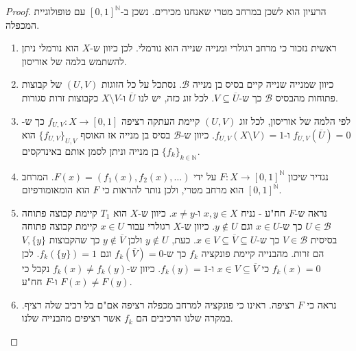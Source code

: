 \documentclass{tstextbook}
\begin{document}
\begin{proof}
הרעיון הוא לשכן במרחב מטרי שאנחנו מכירים. נשכן ב-\([0,1]^{\mathbb{N}}\) עם טופולוגיית המכפלה.

  \begin{enumerate}
    \item ראשית נזכור כי מרחב רגולרי ומנייה שנייה הוא נורמלי. לכן כיוון ש-\(X\) הוא נורמלי ניתן להשתמש בלמה של אוריסון. 


    \item כיוון שמנייה שנייה קיים בסיס בן מנייה \(\mathcal{B}\). נסתכל על כל הזוגות \((U,V)\) של קבוצות פתוחות מהבסיס \(\mathcal{B}\) כך ש-\(V\subseteq\overline{U}\). לכל זוג כזה, יש לנו \(\overline{U}\) ו-\(X\setminus V\) כקבוצות זרות סגורות. 


    \item לפי הלמה של אוריסון, לכל זוג \((U,V)\) קיימת העתקה רציפה \(f_{U,V}:X\to[0,1]\) כך ש-\(f_{U,V}\left( \overline{U} \right)=0\) ו-\(f_{U,V}\left( X\setminus V \right)=1\). כיוון ש-\(\mathcal{B}\) בסיס בן מנייה אז האוסף \(\{ f_{U,V} \}_{U,V}\) הוא בן מנייה וניתן לסמן אותם באינדקסים \(\{ f_{k} \}_{k \in \mathbb{N}}\). 


    \item נגדיר שיכון \(F:X\to [0,1]^{\mathbb{N}}\) על ידי \(F(x)=\left( f_{1}(x),f_{2}(x),\dots \right)\). המרחב \([0,1]^{\mathbb{N}}\) הוא מרחב מטרי, ולכן נותר להראות כי \(F\) הוא הומאומורפיזם. 


    \item נראה ש-\(F\) חח"ע - נניח \(x,y \in X\) ו-\(x \neq y\). כיוון ש-\(X\) הוא \(T_{1}\) קיימת קבוצה פתוחה \(U \in \mathcal{B}\) כך ש-\(x \in U\) וגם \(y \not \in U\). כיוון ש-\(X\) רגולרי עבור \(x \in U\) קיימת קבוצה פתוחה בסיסית \(V \in \mathcal{B}\) כך ש-\(x \in V \subseteq \overline{V}\subseteq U\). כעת, \(y\not \in U\) ולכן \(y \not \in \overline{V}\)  כך שהקבוצות \(V,\{ y \}\) הם זרות. מהבנייה קיימת פונקציה \(f_{k}\) כך ש-\(f_{k}\left( \overline{V} \right)=0\) וגם \(f_{k}\left( \{ y \} \right)=1\). לכן \(f_{k}(x)=0\) כי \(x \in V\subseteq \overline{V}\) ו-\(f_{k}(y)=1\). כיוון ש-\(f_{k}(x)\neq f_{k}(y)\) נקבל כי \(F(x)\neq F(y)\) ו-\(F\) חח"ע. 


    \item נראה כי \(F\) רציפה. ראינו כי פונקציה למרחב מכפלה רציפה אם"ם כל רכיב שלה רציף. במקרה שלנו הרכיבים הם \(f_{k}\) אשר רציפים מהבנייה שלנו. 



\end{enumerate}
\end{proof}
\end{document}
